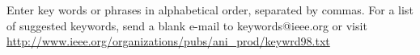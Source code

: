 \documentclass{ieeeaccess}
\begin{document}
\begin{keywords}
Enter key words or phrases in alphabetical 
order, separated by commas. For a list of suggested keywords, send a blank 
e-mail to keywords@ieee.org or visit \underline
{http://www.ieee.org/organizations/pubs/ani\_prod/keywrd98.txt}
\end{keywords}

\titlepgskip=-15pt

\maketitle




%





%
%
%
\end{document}
